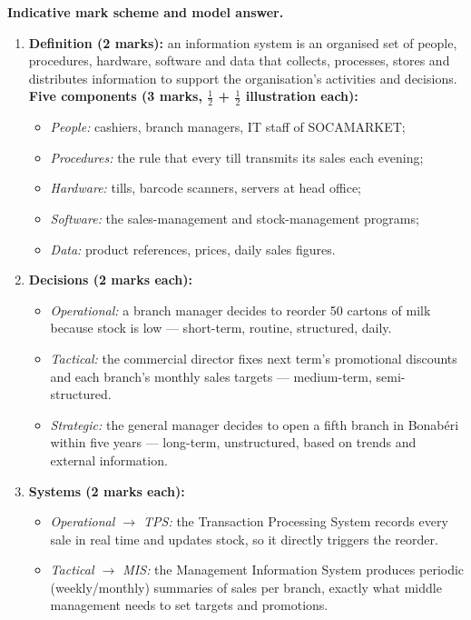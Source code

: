 \documentclass[11pt]{article}
\begin{document}
\begin{corrige}
\textbf{Indicative mark scheme and model answer.}
\begin{enumerate}
\item \textbf{Definition (2 marks):} an information system is an organised set of people, procedures, hardware, software and data that collects, processes, stores and distributes information to support the organisation's activities and decisions. \textbf{Five components (3 marks, $\frac{1}{2}$ + $\frac{1}{2}$ illustration each):}
\begin{itemize}
\item \emph{People:} cashiers, branch managers, IT staff of SOCAMARKET;
\item \emph{Procedures:} the rule that every till transmits its sales each evening;
\item \emph{Hardware:} tills, barcode scanners, servers at head office;
\item \emph{Software:} the sales-management and stock-management programs;
\item \emph{Data:} product references, prices, daily sales figures.
\end{itemize}
\item \textbf{Decisions (2 marks each):}
\begin{itemize}
\item \emph{Operational:} a branch manager decides to reorder 50 cartons of milk because stock is low — short-term, routine, structured, daily.
\item \emph{Tactical:} the commercial director fixes next term's promotional discounts and each branch's monthly sales targets — medium-term, semi-structured.
\item \emph{Strategic:} the general manager decides to open a fifth branch in Bonabéri within five years — long-term, unstructured, based on trends and external information.
\end{itemize}
\item \textbf{Systems (2 marks each):}
\begin{itemize}
\item \emph{Operational $\to$ TPS:} the Transaction Processing System records every sale in real time and updates stock, so it directly triggers the reorder.
\item \emph{Tactical $\to$ MIS:} the Management Information System produces periodic (weekly/monthly) summaries of sales per branch, exactly what middle management needs to set targets and promotions.

\end{itemize}
\end{enumerate}
\end{corrige}
\end{document}
